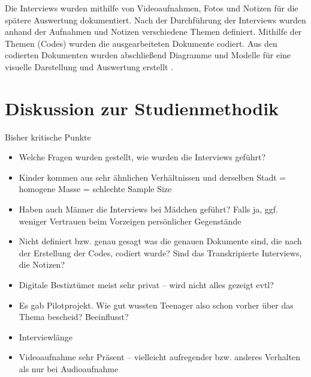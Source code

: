 \documentclass{hsflensburg}
\begin{document}
	Die Interviews wurden mithilfe von Videoaufnahmen, Fotos und Notizen für die spätere Auswertung dokumentiert. Nach der Durchführung
	der Interviews wurden anhand der Aufnahmen und Notizen verschiedene Themen
	definiert. Mithilfe der Themen (Codes) wurden die ausgearbeiteten
	Dokumente codiert. Aus den codierten Dokumenten wurden abschließend Diagramme und Modelle für eine visuelle Darstellung und Auswertung erstellt  \cite{odom2011teenagers}. 

	\section{Diskussion zur Studienmethodik}

	Bisher kritische Punkte

	\begin{itemize}
	\item Welche Fragen wurden gestellt, wie wurden die Interviews geführt?
	\item Kinder kommen aus sehr ähnlichen Verhältnissen und derselben Stadt = homogene Masse = schlechte Sample Size
	\item Haben auch Männer die Interviews bei Mädchen geführt? Falls ja, ggf. weniger Vertrauen beim Vorzeigen persönlicher Gegenstände
	\item Nicht definiert bzw. genau gesagt was die genauen Dokumente sind, die nach der Erstellung der Codes, codiert wurde? Sind
		das Transkripierte Interviews, die Notizen?
		\item Digitale Bestiztümer meist sehr privat – wird nicht alles gezeigt evtl?
		\item Es gab Pilotprojekt. Wie gut wussten Teenager also schon vorher über das Thema bescheid? Beeinflusst?
		\item Interviewlänge
		\item Videoaufnahme sehr Präsent – vielleicht aufregender bzw. anderes Verhalten als nur bei Audioaufnahme
	\end{itemize}
	

	\clearpage
	\nocite{*}	
	
	
\end{document}
